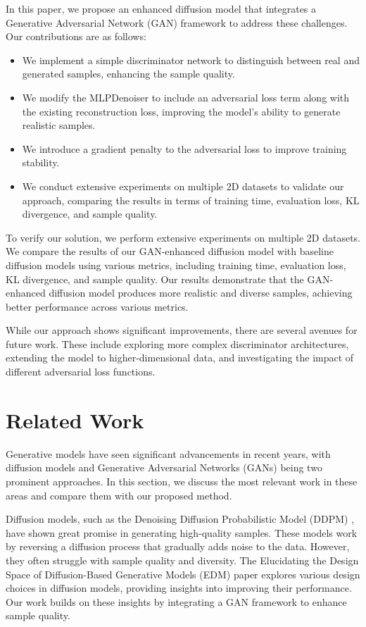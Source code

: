 \documentclass{article} %
\begin{document}
In this paper, we propose an enhanced diffusion model that integrates a Generative Adversarial Network (GAN) framework to address these challenges. Our contributions are as follows:
\begin{itemize}
    \item We implement a simple discriminator network to distinguish between real and generated samples, enhancing the sample quality.
    \item We modify the MLPDenoiser to include an adversarial loss term along with the existing reconstruction loss, improving the model's ability to generate realistic samples.
    \item We introduce a gradient penalty to the adversarial loss to improve training stability.
    \item We conduct extensive experiments on multiple 2D datasets to validate our approach, comparing the results in terms of training time, evaluation loss, KL divergence, and sample quality.
\end{itemize}

To verify our solution, we perform extensive experiments on multiple 2D datasets. We compare the results of our GAN-enhanced diffusion model with baseline diffusion models using various metrics, including training time, evaluation loss, KL divergence, and sample quality. Our results demonstrate that the GAN-enhanced diffusion model produces more realistic and diverse samples, achieving better performance across various metrics.

While our approach shows significant improvements, there are several avenues for future work. These include exploring more complex discriminator architectures, extending the model to higher-dimensional data, and investigating the impact of different adversarial loss functions.

\section{Related Work}
\label{sec:related}

Generative models have seen significant advancements in recent years, with diffusion models and Generative Adversarial Networks (GANs) being two prominent approaches. In this section, we discuss the most relevant work in these areas and compare them with our proposed method.

Diffusion models, such as the Denoising Diffusion Probabilistic Model (DDPM) \citep{ddpm}, have shown great promise in generating high-quality samples. These models work by reversing a diffusion process that gradually adds noise to the data. However, they often struggle with sample quality and diversity. The Elucidating the Design Space of Diffusion-Based Generative Models (EDM) \citep{edm} paper explores various design choices in diffusion models, providing insights into improving their performance. Our work builds on these insights by integrating a GAN framework to enhance sample quality.
\end{document}
